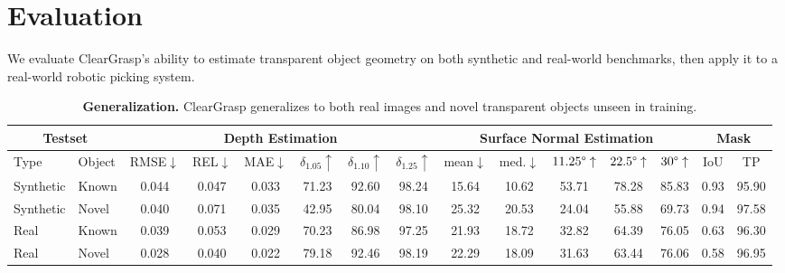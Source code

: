 \documentclass[letterpaper, 10 pt, conference]{ieeeconf}
\begin{document}
\section{Evaluation}
We evaluate ClearGrasp's ability to estimate transparent object geometry on both synthetic and real-world benchmarks, then apply it to a real-world robotic picking system.  

\begin{table*}[t]
    \centering
    \caption{\textbf{Generalization.} ClearGrasp generalizes to both real images and novel transparent objects unseen in training.  \label{table:results_depth}} \vspace{-2mm}
    \setlength\tabcolsep{5.0pt}
     
    \begin{tabular}{ll|cccccc|ccccc|cc}
        \toprule
        \multicolumn{2}{c}{Testset} & \multicolumn{6}{|c|}{Depth Estimation} & \multicolumn{5}{c}{Surface Normal Estimation} & \multicolumn{2}{|c}{Mask}  \\
        \midrule
          Type & Object & RMSE$\downarrow$ & REL$\downarrow$ & MAE$\downarrow$ & $\delta_{1.05}\uparrow$ & $\delta_{1.10}\uparrow$ & $\delta_{ 1.25}\uparrow$ & mean$\downarrow$ & med.$\downarrow$ & $11.25\degree\uparrow$ & $22.5\degree\uparrow$ & $30\degree\uparrow$ & IoU & TP \\
        \midrule
        Synthetic & Known & 0.044 & 0.047 & 0.033 & 71.23 & 92.60 & 98.24 & 15.64 & 10.62 & 53.71 & 78.28 & 85.83 & 0.93 & 95.90 \\
        Synthetic & Novel & 0.040 & 0.071 & 0.035 & 42.95 & 80.04 & 98.10 & 25.32 & 20.53 & 24.04 & 55.88 & 69.73 & 0.94 & 97.58 \\
        \midrule
        Real    & Known & 0.039 & 0.053 & 0.029 & 70.23 & 86.98 & 97.25 & 21.93 & 18.72 & 32.82 & 64.39 & 76.05 & 0.63 & 96.30 \\
        Real    & Novel & 0.028 & 0.040 & 0.022 & 79.18 & 92.46 & 98.19 & 22.29 & 18.09 & 31.63 & 63.44 & 76.06 & 0.58 & 96.95 \\
        \bottomrule 
    \end{tabular}
   \vspace{-2mm}
   
\end{table*}
\end{document}
